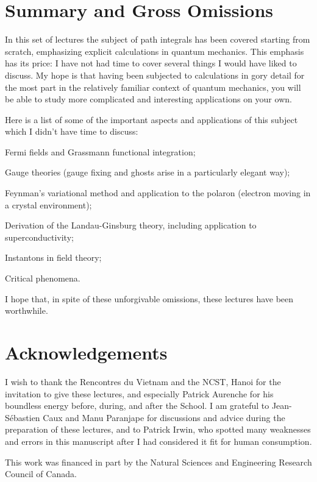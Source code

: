 \documentclass[12pt]{article}
\begin{document}
\section[Summary]{Summary and Gross Omissions}

In this set of lectures the subject of path integrals has been covered
starting from scratch, emphasizing explicit calculations in quantum
mechanics. This emphasis has its price: I have not had time to cover
several things I would have liked to discuss.
My hope is that having been subjected to calculations
in gory detail for the most part
in the relatively familiar context of quantum mechanics, you will be
able to study  more complicated and interesting
applications on your own.

Here is a list of some of the important aspects and applications of
this subject which I didn't have time to discuss:
\ben
\item Fermi fields and Grassmann functional integration;
\item Gauge theories (gauge fixing and ghosts arise in a particularly
  elegant way);
\item Feynman's variational method and application to the polaron
  (electron moving in a crystal environment);
\item Derivation of the Landau-Ginsburg theory, including application
  to superconductivity;
\item Instantons in field theory;
\item Critical phenomena.
\een

I hope that, in spite of these unforgivable omissions, these lectures
have been worthwhile.

\section{Acknowledgements}

I wish to thank the Rencontres du Vietnam and the NCST, Hanoi for the
invitation to give these lectures, and especially Patrick Aurenche for
his boundless energy before, during, and after the School. I am
grateful to Jean-S\'ebastien Caux and Manu Paranjape for discussions
and advice during the preparation of these lectures, and to Patrick
Irwin, who spotted many weaknesses and errors in this manuscript after
I had considered it fit for human consumption.

This work was financed in part by the Natural Sciences and Engineering
Research Council of Canada.
\end{document}
